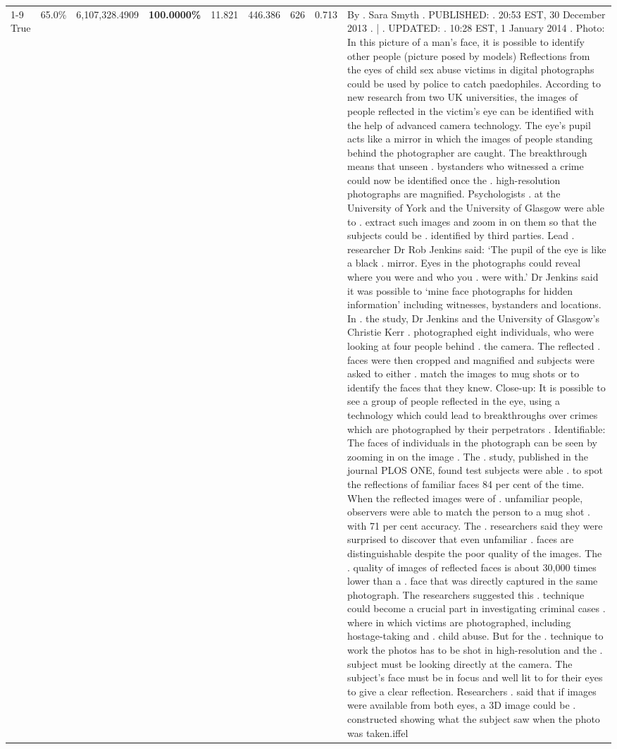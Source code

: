 \begin{table}[H]
\begin{tabular}{lllrlllll}
\cline{1-9}
True & 65.0\% & 6,107,328.4909 & \bfseries \color{red} 100.0000\% & 11.821 & 446.386 & 626 & 0.713 & By . Sara Smyth . PUBLISHED: . 20:53 EST, 30 December 2013 . | . UPDATED: . 10:28 EST, 1 January 2014 . Photo: In this picture of a man's face, it is possible to identify other people (picture posed by models) Reflections from the eyes of child sex abuse victims in digital photographs could be used by police to catch paedophiles. According to new research from two UK universities, the images of people reflected in the victim's eye can be identified with the help of advanced camera technology. The eye's pupil acts like a mirror in which the images of people standing behind the photographer are caught. The breakthrough means that unseen . bystanders who witnessed a crime could now be identified once the . high-resolution photographs are magnified. Psychologists . at the University of York and the University of Glasgow were able to . extract such images and zoom in on them so that the subjects could be . identified by third parties. Lead . researcher Dr Rob Jenkins said: ‘The pupil of the eye is like a black . mirror. Eyes in the photographs could reveal where you were and who you . were with.' Dr Jenkins said it was possible to ‘mine face photographs for hidden information' including witnesses, bystanders and locations. In . the study, Dr Jenkins and the University of Glasgow's Christie Kerr . photographed eight individuals, who were looking at four people behind . the camera. The reflected . faces were then cropped and magnified and subjects were asked to either . match the images to mug shots or to identify the faces that they knew. Close-up: It is possible to see a group of people reflected in the eye, using a technology which could lead to breakthroughs over crimes which are photographed by their perpetrators . Identifiable: The faces of individuals in the photograph can be seen by zooming in on the image . The . study, published in the journal PLOS ONE, found test subjects were able . to spot the reflections of familiar faces 84 per cent of the time. When the reflected images were of . unfamiliar people, observers were able to match the person to a mug shot . with 71 per cent accuracy. The . researchers said they were surprised to discover that even unfamiliar . faces are distinguishable despite the poor quality of the images. The . quality of images of reflected faces is about 30,000 times lower than a . face that was directly captured in the same photograph. The researchers suggested this . technique could become a crucial part in investigating criminal cases . where in which victims are photographed, including hostage-taking and . child abuse. But for the . technique to work the photos has to be shot in high-resolution and the . subject must be looking directly at the camera. The subject's face must be in focus and well lit to for their eyes to give a clear reflection. Researchers . said that if images were available from both eyes, a 3D image could be . constructed showing what the subject saw when the photo was taken.iffel \\

\end{tabular}
\end{table}

